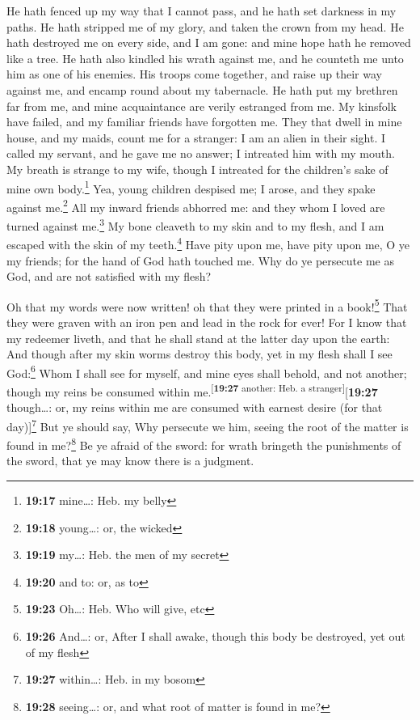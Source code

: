  He hath fenced up my way that I cannot pass, and he hath
set darkness in my paths.  He hath stripped me of my
glory, and taken the crown from my head.  He hath
destroyed me on every side, and I am gone: and mine hope hath he removed
like a tree.  He hath also kindled his wrath against me,
and he counteth me unto him as one of his enemies.  His
troops come together, and raise up their way against me, and encamp
round about my tabernacle.  He hath put my brethren far
from me, and mine acquaintance are verily estranged from me.
 My kinsfolk have failed, and my familiar friends have
forgotten me.  They that dwell in mine house, and my
maids, count me for a stranger: I am an alien in their sight.
 I called my servant, and he gave me no answer; I
intreated him with my mouth.  My breath is strange to my
wife, though I intreated for the children's sake of mine own
body.\footnote{\textbf{19:17} mine\ldots: Heb. my belly} 
Yea, young children despised me; I arose, and they spake against
me.\footnote{\textbf{19:18} young\ldots: or, the wicked} 
All my inward friends abhorred me: and they whom I loved are turned
against me.\footnote{\textbf{19:19} my\ldots: Heb. the men of my secret}
 My bone cleaveth to my skin and to my flesh, and I am
escaped with the skin of my teeth.\footnote{\textbf{19:20} and to: or,
  as to}  Have pity upon me, have pity upon me, O ye my
friends; for the hand of God hath touched me.  Why do ye
persecute me as God, and are not satisfied with my flesh?

 Oh that my words were now written! oh that they were
printed in a book!\footnote{\textbf{19:23} Oh\ldots: Heb. Who will give,
  etc}  That they were graven with an iron pen and lead
in the rock for ever!  For I know that my redeemer
liveth, and that he shall stand at the latter day upon the earth:
 And though after my skin worms destroy this body, yet in
my flesh shall I see God:\footnote{\textbf{19:26} And\ldots: or, After I
  shall awake, though this body be destroyed, yet out of my flesh}
 Whom I shall see for myself, and mine eyes shall behold,
and not another; though my reins be consumed within
me.\textsuperscript{{[}\textbf{19:27} another: Heb. a
stranger{]}}{[}\textbf{19:27} though\ldots: or, my reins within me are
consumed with earnest desire (for that day){]}\footnote{\textbf{19:27}
  within\ldots: Heb. in my bosom}  But ye should say, Why
persecute we him, seeing the root of the matter is found in
me?\footnote{\textbf{19:28} seeing\ldots: or, and what root of matter is
  found in me?}  Be ye afraid of the sword: for wrath
bringeth the punishments of the sword, that ye may know there is a
judgment.

